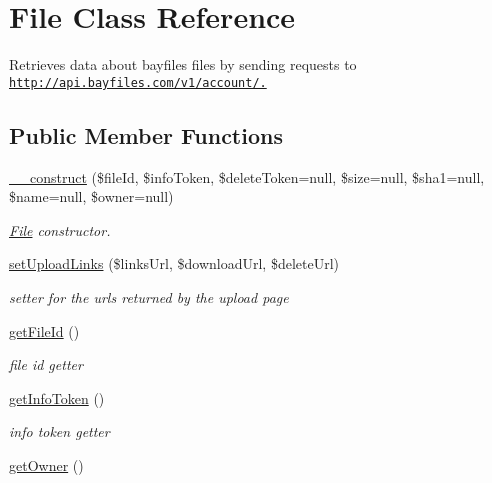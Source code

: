 \hypertarget{classFile}{
\section{File Class Reference}
\label{classFile}
}


Retrieves data about bayfiles files by sending requests to \href{http://api.bayfiles.com/v1/account/.}{\tt http://api.bayfiles.com/v1/account/.}  


\subsection*{Public Member Functions}
\begin{DoxyCompactItemize}
\item 
\hyperlink{classFile_ad6ff8555973b48a3448ac72b57d8eb0c}{\_\-\_\-construct} (\$fileId, \$infoToken, \$deleteToken=null, \$size=null, \$sha1=null, \$name=null, \$owner=null)
\begin{DoxyCompactList}\small\item\em \hyperlink{classFile}{File} constructor. \end{DoxyCompactList}\item 
\hyperlink{classFile_a1734f775deab26bff1d65b81bfcde912}{setUploadLinks} (\$linksUrl, \$downloadUrl, \$deleteUrl)
\begin{DoxyCompactList}\small\item\em setter for the urls returned by the upload page \end{DoxyCompactList}\item 
\hypertarget{classFile_ac03d207f917ec00633b2247ce677e6fa}{
\hyperlink{classFile_ac03d207f917ec00633b2247ce677e6fa}{getFileId} ()}
\label{classFile_ac03d207f917ec00633b2247ce677e6fa}

\begin{DoxyCompactList}\small\item\em file id getter \end{DoxyCompactList}\item 
\hypertarget{classFile_a42aef8a534d0942e56e9931e5f0f9bc6}{
\hyperlink{classFile_a42aef8a534d0942e56e9931e5f0f9bc6}{getInfoToken} ()}
\label{classFile_a42aef8a534d0942e56e9931e5f0f9bc6}

\begin{DoxyCompactList}\small\item\em info token getter \end{DoxyCompactList}\item 
\hypertarget{classFile_af2a662256b5fe5246cdda50612206ad6}{
\hyperlink{classFile_af2a662256b5fe5246cdda50612206ad6}{getOwner} ()}
\label{classFile_af2a662256b5fe5246cdda50612206ad6}


\end{DoxyCompactItemize}
